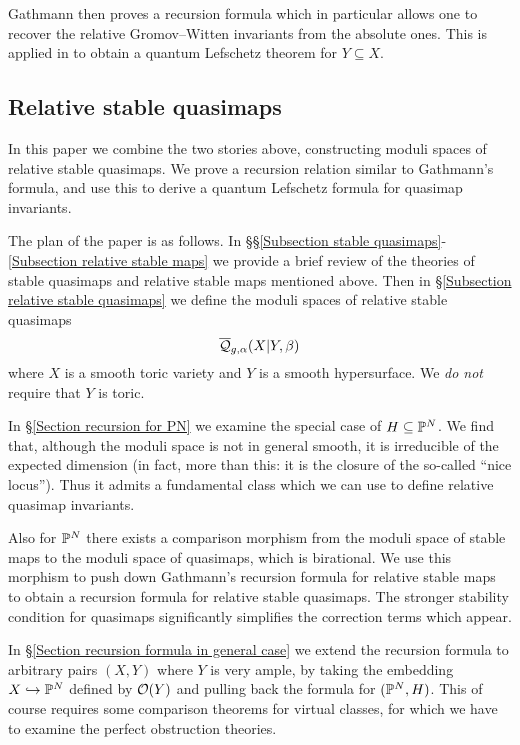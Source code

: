 Gathmann then proves a recursion formula which in particular allows one to recover the relative Gromov--Witten invariants from the absolute ones. This is  applied in \cite{Ga-MF} to obtain a quantum Lefschetz theorem for $Y \subseteq X$.

\subsection{Relative stable quasimaps}
In this paper we combine the two stories above, constructing moduli spaces of relative stable quasimaps. We prove a recursion relation similar to Gathmann's formula, and use this to derive a quantum Lefschetz formula for quasimap invariants.

The plan of the paper is as follows. In \S\S \ref{Subsection stable quasimaps}-\ref{Subsection relative stable maps} we provide a brief review of the theories of stable quasimaps and relative stable maps mentioned above. Then in \S \ref{Subsection relative stable quasimaps} we define the moduli spaces of relative stable quasimaps
\begin{equation*} \overline{\mathcal Q}_{g,\alpha}(X|Y,\beta) \end{equation*}
where $X$ is a smooth toric variety and $Y$ is a smooth hypersurface. We \emph{do not} require that $Y$ is toric.

In \S \ref{Section recursion for PN} we examine the special case of $H \subseteq \mathbb P^N$. We find that, although the moduli space is not in general smooth, it is irreducible of the expected dimension (in fact, more than this: it is the closure of the so-called ``nice locus''). Thus it admits a fundamental class which we can use to define relative quasimap invariants.

Also for $\mathbb P^N$ there exists a comparison morphism from the moduli space of stable maps to the moduli space of quasimaps, which is birational. We use this morphism to push down Gathmann's recursion formula for relative stable maps to obtain a recursion formula for relative stable quasimaps. The stronger stability condition for quasimaps significantly simplifies the correction terms which appear.

In \S \ref{Section recursion formula in general case} we extend the recursion formula to arbitrary pairs $(X,Y)$ where $Y$ is very ample, by taking the embedding $X \hookrightarrow \mathbb P^N$ defined by $\mathcal{O}(Y)$ and pulling back the formula for $(\mathbb P^N,H)$. This of course requires some comparison theorems for virtual classes, for which we have to examine the perfect obstruction theories.

